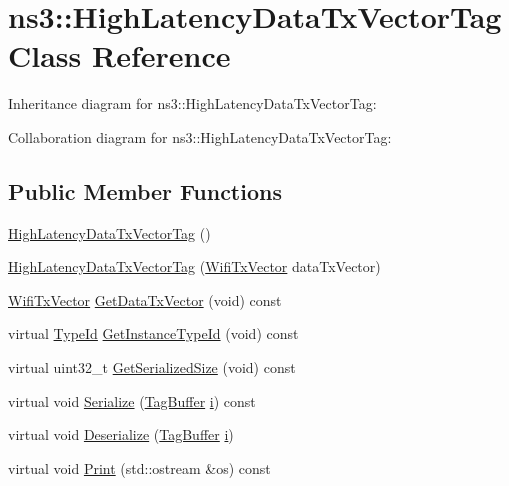 \hypertarget{classns3_1_1HighLatencyDataTxVectorTag}{}\section{ns3\+:\+:High\+Latency\+Data\+Tx\+Vector\+Tag Class Reference}
\label{classns3_1_1HighLatencyDataTxVectorTag}


Inheritance diagram for ns3\+:\+:High\+Latency\+Data\+Tx\+Vector\+Tag\+:


Collaboration diagram for ns3\+:\+:High\+Latency\+Data\+Tx\+Vector\+Tag\+:
\subsection*{Public Member Functions}
\begin{DoxyCompactItemize}
\item 
\hyperlink{classns3_1_1HighLatencyDataTxVectorTag_ab603a83ceb46c81a61deb6f197c0bdff}{High\+Latency\+Data\+Tx\+Vector\+Tag} ()
\item 
\hyperlink{classns3_1_1HighLatencyDataTxVectorTag_ae1fde451ed3cd4fe856d49bca64cf6b0}{High\+Latency\+Data\+Tx\+Vector\+Tag} (\hyperlink{classns3_1_1WifiTxVector}{Wifi\+Tx\+Vector} data\+Tx\+Vector)
\item 
\hyperlink{classns3_1_1WifiTxVector}{Wifi\+Tx\+Vector} \hyperlink{classns3_1_1HighLatencyDataTxVectorTag_a08b0ea7153943b319d8fe5c1a9f3aef8}{Get\+Data\+Tx\+Vector} (void) const 
\item 
virtual \hyperlink{classns3_1_1TypeId}{Type\+Id} \hyperlink{classns3_1_1HighLatencyDataTxVectorTag_ae2ad1225d6edf7ebd5d17020723aa97f}{Get\+Instance\+Type\+Id} (void) const 
\item 
virtual uint32\+\_\+t \hyperlink{classns3_1_1HighLatencyDataTxVectorTag_a16bddc40dcbeac74e7571ba5cf295877}{Get\+Serialized\+Size} (void) const 
\item 
virtual void \hyperlink{classns3_1_1HighLatencyDataTxVectorTag_a18cc35a7bd93b4f2ed3c3da575cf33eb}{Serialize} (\hyperlink{classns3_1_1TagBuffer}{Tag\+Buffer} \hyperlink{lte__uplink__power__control_8m_a6f6ccfcf58b31cb6412107d9d5281426}{i}) const 
\item 
virtual void \hyperlink{classns3_1_1HighLatencyDataTxVectorTag_aee07c6933de3e8f5962fd1f94d44d716}{Deserialize} (\hyperlink{classns3_1_1TagBuffer}{Tag\+Buffer} \hyperlink{lte__uplink__power__control_8m_a6f6ccfcf58b31cb6412107d9d5281426}{i})
\item 
virtual void \hyperlink{classns3_1_1HighLatencyDataTxVectorTag_a98e05c2e9a20a2744d990a0f52c39bb0}{Print} (std\+::ostream \&os) const 
\end{DoxyCompactItemize}
